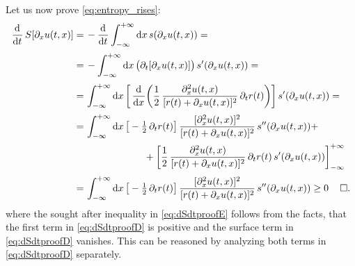 Let us now prove \cref{eq:entropy_rises}:
\begin{subequations}\label{eq:dSdtproof}
\begin{align}
\dod{}{t} S [ \partial_x u ( t, x ) ] =\, & - \dod{}{t} \int_{-\infty}^{+\infty} \dif x \, s ( \partial_x u ( t, x ) )=\\*[.2em] %
	= \,& - \int_{-\infty}^{+\infty} \dif x \, \big( \partial_t [ \partial_x u ( t, x ) ] \big) \, s^\prime ( \partial_x u ( t, x ) ) =	
	\\*[.2em] %
	= \, & \int_{-\infty}^{+\infty} \dif x \, \bigg[ \dod{}{x} \! \bigg( \frac{1}{2} \, \frac{\partial_x^2 u ( t, x )}{[ r ( t ) + \partial_x u ( t , x ) ]^2}\,\partial_t r ( t )  \bigg) \bigg] \, s^\prime ( \partial_x u ( t, x ) ) =	\\*[.2em] %
	= \, & \int_{-\infty}^{+\infty} \dif x \, \big[ - \tfrac{1}{2} \, \partial_t r ( t ) \big]  \, \frac{[\partial_x^2 u ( t, x )]^2}{[ r ( t ) + \partial_x u ( t , x ) ]^2} \, s^{\prime\prime} ( \partial_x u ( t, x ) ) +\notag\\*[.1em] %
	&\qquad\qquad\qquad+\bigg[ \frac{1}{2} \, \frac{\partial_x^2 u ( t, x )}{[r ( t ) + \partial_x u ( t , x )]^2}\, \partial_t r ( t )  \, s^{\prime} ( \partial_x u ( t, x ) ) \bigg]_{-\infty}^{+\infty}	\label{eq:dSdtproofD}\\*[.2em] %
	=\,& \int_{-\infty}^{+\infty} \dif x \,\big[ - \tfrac{1}{2} \, \partial_t r ( t ) \big] \, \frac{[\partial_x^2 u ( t, x )]^2}{[ r ( t ) + \partial_x u ( t , x ) ]^2}\, s^{\prime\prime} ( \partial_x u ( t, x ) )\ge 0\,\quad \square{}.  \label{eq:dSdtproofE}
\end{align}
\end{subequations}
where the sought after inequality in \cref{eq:dSdtproofE} follows from the facts, that the first term in \cref{eq:dSdtproofD} is positive and the surface term in \cref{eq:dSdtproofD} vanishes.
This can be reasoned by analyzing both terms in \cref{eq:dSdtproofD} separately.
